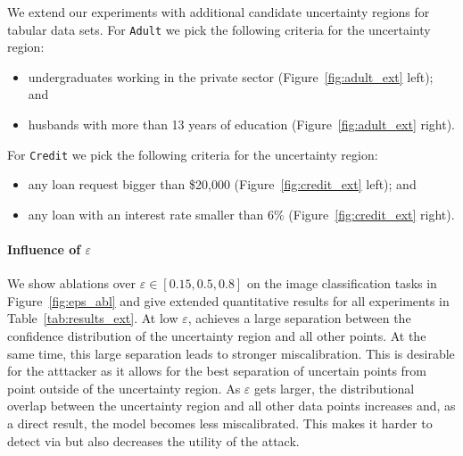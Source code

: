 We extend our experiments with additional candidate uncertainty regions for tabular data sets. For \texttt{Adult} we pick the following criteria for the uncertainty region:
\begin{itemize}[noitemsep]
    \item undergraduates working in the private sector (Figure~\ref{fig:adult_ext} left); and 
    \item husbands with more than 13 years of education (Figure~\ref{fig:adult_ext} right).
\end{itemize}
For \texttt{Credit} we pick the following criteria for the uncertainty region:
\begin{itemize}[noitemsep]
    \item any loan request bigger than \$20,000 (Figure~\ref{fig:credit_ext} left); and
    \item any loan with an interest rate smaller than 6\% (Figure~\ref{fig:credit_ext} right).
\end{itemize}

\paragraph{Influence of $\varepsilon$} We show ablations over $\varepsilon \in [0.15,0.5,0.8]$ on the image classification tasks in Figure~\ref{fig:eps_abl} and give extended quantitative results for all experiments in Table~\ref{tab:results_ext}. At low $\varepsilon$, \attack achieves a large separation between the confidence distribution of the uncertainty region and all other points. At the same time, this large separation leads to stronger miscalibration. This is desirable for the atttacker as it allows for the best separation of uncertain points from point outside of the uncertainty region. As $\varepsilon$ gets larger, the distributional overlap between the uncertainty region and all other data points increases and, as a direct result, the model becomes less miscalibrated. This makes it harder to detect \attack via \name but also decreases the utility of the attack.

